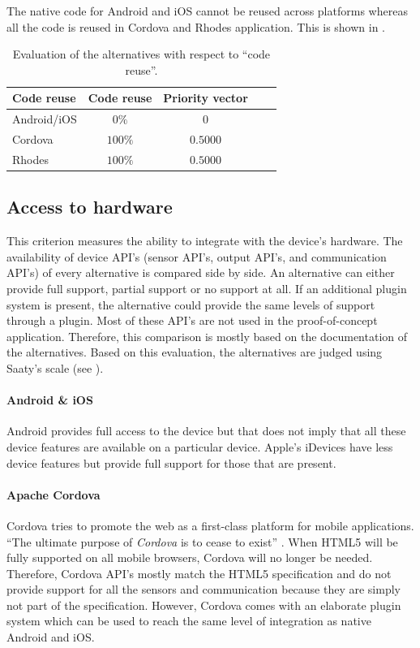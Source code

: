 The native code for Android and iOS cannot be reused across platforms whereas all the code is reused in Cordova and Rhodes application. This is shown in . 

\begin{table}[h!]
    \centering
    \begin{tabular}{lcccl}
        \hline
        \textbf{Code reuse} & Code reuse & Priority vector \\
        \hline
        Android/iOS         & $0\%$       & $0$            \\
        Cordova             & $100\%$     & $0.5000$       \\
        Rhodes              & $100\%$     & $0.5000$       \\
        \hline
    \end{tabular}
    \caption{Evaluation of the alternatives with respect to ``code reuse''.}
    \label{tab:cr}
\end{table}

\subsection{Access to hardware}

This criterion measures the ability to integrate with the device's hardware. The availability of device API's (sensor API's, output API's, and communication API's) of every alternative is compared side by side. An alternative can either provide full support, partial support or no support at all. If an additional plugin system is present, the alternative could provide the same levels of support through a plugin. Most of these API's are not used in the proof-of-concept application. Therefore, this comparison is mostly based on the documentation of the alternatives. Based on this evaluation, the alternatives are judged using Saaty's scale (see ).

\paragraph{Android \& iOS} Android provides full access to the device but that does not imply that all these device features are available on a particular device. Apple's iDevices have less device features but provide full support for those that are present.

\paragraph{Apache Cordova} Cordova tries to promote the web as a first-class platform for mobile applications. ``The ultimate purpose of \emph{Cordova} is to cease to exist'' \cite{LeRoux:2012}. When HTML5 will be fully supported on all mobile browsers, Cordova will no longer be needed. Therefore, Cordova API's mostly match the HTML5 specification and do not provide support for all the sensors and communication because they are simply not part of the specification. However, Cordova comes with an elaborate plugin system which can be used to reach the same level of integration as native Android and iOS. 

